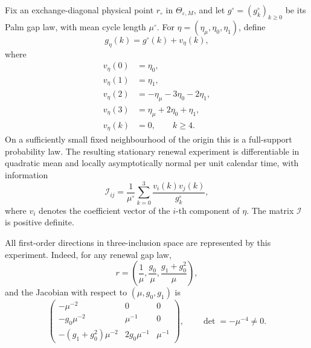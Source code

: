 \begin{proposition}
\label{prop:joint-physical-image-local-power-main}
Fix an exchange-diagonal physical point \(r_\circ\) in
\(\Theta_{\varepsilon,M}\), and let \(g^\circ=(g_k^\circ)_{k\ge0}\) be its
Palm gap law, with mean cycle length \(\mu^\circ\).  For
\(\eta=(\eta_\mu,\eta_0,\eta_1)\), define
\[
g_\eta(k)=g^\circ(k)+v_\eta(k),
\]
where
\[
\begin{aligned}
v_\eta(0)&=\eta_0,\\
v_\eta(1)&=\eta_1,\\
v_\eta(2)&=-\eta_\mu-3\eta_0-2\eta_1,\\
v_\eta(3)&=\eta_\mu+2\eta_0+\eta_1,\\
v_\eta(k)&=0,\qquad k\ge4.
\end{aligned}
\]
On a sufficiently small fixed neighbourhood of the origin this is a
full-support probability law.  The resulting stationary renewal experiment
is differentiable in quadratic mean and locally asymptotically normal per
unit calendar time, with information
\[
\mathcal I_{ij}
=\frac1{\mu^\circ}\sum_{k=0}^3
\frac{v_i(k)v_j(k)}{g_k^\circ},
\]
where \(v_i\) denotes the coefficient vector of the \(i\)-th component of
\(\eta\).  The matrix \(\mathcal I\) is positive definite.

All first-order directions in three-inclusion space are represented by this
experiment.  Indeed, for any renewal gap law,
\[
r=\left(\frac1\mu,\frac{g_0}{\mu},
\frac{g_1+g_0^2}{\mu}\right),
\]
and the Jacobian with respect to \((\mu,g_0,g_1)\) is
\[
\begin{pmatrix}
-\mu^{-2}&0&0\\
-g_0\mu^{-2}&\mu^{-1}&0\\
-(g_1+g_0^2)\mu^{-2}&2g_0\mu^{-1}&\mu^{-1}
\end{pmatrix},
\qquad \det=-\mu^{-4}\ne0.
\]


\end{proposition}
